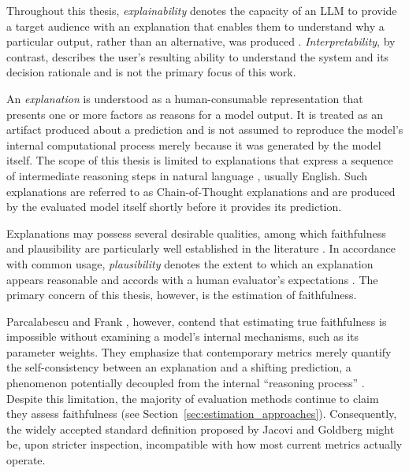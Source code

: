 Throughout this thesis, \emph{explainability} denotes the capacity of an LLM to provide a target audience with an explanation that enables them to understand why a particular output, rather than an alternative, was produced \cite{ISOIECTR, aliExplainableArtificialIntelligence2023, roscherExplainableMachineLearning2020}. \emph{Interpretability}, by contrast, describes the user's resulting ability to understand the system and its decision rationale \cite{garouaniInvestigatingDualityInterpretability2024, aliExplainableArtificialIntelligence2023} and is not the primary focus of this work.

An \emph{explanation} is understood as a human-consumable representation that presents one or more factors as reasons for a model output. It is treated as an artifact produced about a prediction and is not assumed to reproduce the model's internal computational process merely because it was generated by the model itself. The scope of this thesis is limited to explanations that express a sequence of intermediate reasoning steps in natural language \cite{zhaoExplainabilityLargeLanguage2024}, usually English. Such explanations are referred to as Chain-of-Thought explanations \cite{weiChainofthoughtPromptingElicits2022} and are produced by the evaluated model itself shortly before it provides its prediction.

Explanations may possess several desirable qualities, among which faithfulness and plausibility are particularly well established in the literature \cite{herreraMakingSenseUnsensible2025, jacoviFaithfullyInterpretableNLP2020, zhuExplanationEraLarge2024, turpinLanguageModelsDont2023}. In accordance with common usage, \emph{plausibility} denotes the extent to which an explanation appears reasonable and accords with a human evaluator's expectations \cite{zhuExplanationEraLarge2024, jacoviFaithfullyInterpretableNLP2020}. The primary concern of this thesis, however, is the estimation of faithfulness.

Parcalabescu and Frank \cite{parcalabescuMeasuringFaithfulnessSelfconsistency2024}, however, contend that estimating true faithfulness is impossible without examining a model's internal mechanisms, such as its parameter weights. They emphasize that contemporary metrics merely quantify the self-consistency between an explanation and a shifting prediction, a phenomenon potentially decoupled from the internal \enquote{reasoning process} \cite{jacoviFaithfullyInterpretableNLP2020}. Despite this limitation, the majority of evaluation methods continue to claim they assess faithfulness (see Section~\ref{sec:estimation_approaches}). Consequently, the widely accepted standard definition proposed by Jacovi and Goldberg \cite{jacoviFaithfullyInterpretableNLP2020} might be, upon stricter inspection, incompatible with how most current metrics actually operate.

